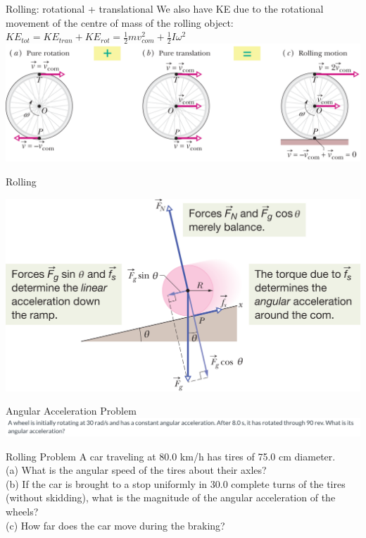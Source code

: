    \begin{frame}{Rolling: rotational + translational}
\small
We also have KE due to the  rotational movement of the centre of mass of the rolling object: \\[1ex]

$KE_{tot} = KE_{tran} + KE_{rot} = \frac{1}{2}mv_{com}^2 + \frac{1}{2} I \omega^2$\\[1ex]

\includegraphics[scale=1]{roll}
\end{frame}

  \begin{frame}{Rolling}
\small

\includegraphics[scale=1]{roll-fric}
\end{frame}


  \begin{frame}{Angular Acceleration Problem}
\small
\includegraphics[scale=0.25]{agpro}
\end{frame}



  \begin{frame}{Rolling Problem}
\small
A car traveling at 80.0 km/h has tires of 75.0 cm diameter. \\[1ex]
(a) What is the angular speed of the tires about their axles?\\[1ex]
(b) If the car is brought to a stop uniformly in 30.0 complete turns of the tires (without skidding), what is the magnitude of the angular acceleration of the wheels? \\[1ex]
(c) How far does the car move during the braking?\\[1ex]
\end{frame}

